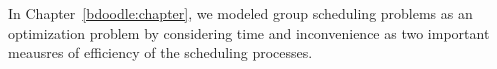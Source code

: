 \label{discussion:chapter}

In Chapter~\ref{bdoodle:chapter}, we modeled group scheduling problems as an optimization problem by considering time and inconvenience as two important meausres of efficiency of the scheduling processes.  
